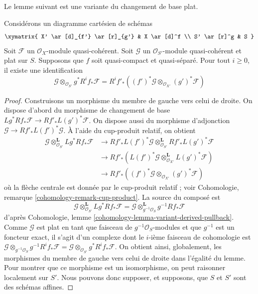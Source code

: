 \noindent
Le lemme suivant est une variante du changement de base plat.

\begin{lemma}
\label{lemma-base-change-tensor-with-flat}
Considérons un diagramme cartésien de schémas
$$
\xymatrix{
X' \ar[d]_{f'} \ar[r]_{g'} & X \ar[d]^f \\
S' \ar[r]^g & S
}
$$
Soit $\mathcal{F}$ un $\mathcal{O}_X$-module quasi-cohérent.
Soit $\mathcal{G}$ un $\mathcal{O}_{S'}$-module quasi-cohérent
et plat sur $S$. Supposons que $f$ soit quasi-compact et quasi-séparé.
Pour tout $i \geq 0$, il existe une identification
$$
\mathcal{G} \otimes_{\mathcal{O}_{S'}} g^*R^if_*\mathcal{F} =
R^if'_*\left((f')^*\mathcal{G}
\otimes_{\mathcal{O}_{X'}} (g')^*\mathcal{F}\right)
$$
\end{lemma}

\begin{proof}
Construisons un morphisme du membre de gauche vers celui de droite. On dispose d'abord du morphisme de changement de base
$Lg^*Rf_*\mathcal{F} \to Rf'_*L(g')^*\mathcal{F}$. On dispose aussi du morphisme
d'adjonction $\mathcal{G} \to Rf'_*L(f')^*\mathcal{G}$. À l'aide du cup-produit relatif,
on obtient
\begin{align*}
\mathcal{G}
\otimes_{\mathcal{O}_{S'}}^\mathbf{L}
Lg^*Rf_*\mathcal{F}
& \to
Rf'_*L(f')^*\mathcal{G}
\otimes_{\mathcal{O}_{S'}}^\mathbf{L}
Rf'_*L(g')^*\mathcal{F} \\
& \to
Rf'_*\left(L(f')^*\mathcal{G}
\otimes_{\mathcal{O}_{X'}}^\mathbf{L}
L(g')^*\mathcal{F}\right) \\
& \to
Rf'_*\left((f')^*\mathcal{G}
\otimes_{\mathcal{O}_{X'}} (g')^*\mathcal{F}\right)
\end{align*}
où la flèche centrale est donnée par le cup-produit relatif ; voir
Cohomologie, remarque \ref{cohomology-remark-cup-product}.
La source du composé est
$$
\mathcal{G} \otimes_{\mathcal{O}_{S'}}^\mathbf{L} Lg^*Rf_*\mathcal{F} =
\mathcal{G} \otimes_{g^{-1}\mathcal{O}_S}^\mathbf{L} g^{-1}Rf_*\mathcal{F}
$$
d'après Cohomologie, lemme \ref{cohomology-lemma-variant-derived-pullback}.
Comme $\mathcal{G}$ est plat en tant que faisceau de $g^{-1}\mathcal{O}_S$-modules
et que $g^{-1}$ est un foncteur exact, il s'agit d'un complexe dont le
$i$-ième faisceau de cohomologie est
$\mathcal{G} \otimes_{g^{-1}\mathcal{O}_S} g^{-1}R^if_*\mathcal{F} =
\mathcal{G} \otimes_{\mathcal{O}_{S'}} g^*R^if_*\mathcal{F}$.
On obtient ainsi, globalement, les morphismes du membre de gauche vers celui de droite
dans l'égalité du lemme. Pour montrer que ce morphisme est un isomorphisme, on peut
raisonner localement sur $S'$. Nous pouvons donc supposer, et supposons, que $S$ et $S'$
sont des schémas affines.


\end{proof}
